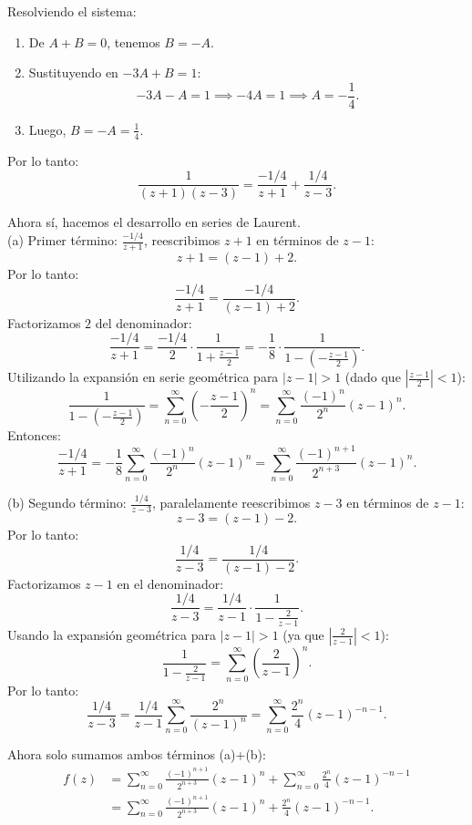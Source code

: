 \documentclass{article}
\begin{document}
\noindent Resolviendo el sistema:
\begin{enumerate}
    
\item  De \( A + B = 0 \), tenemos \( B = -A \).
\item Sustituyendo en \( -3A + B = 1 \):
   \[
   -3A - A = 1 \implies -4A = 1 \implies A = -\frac{1}{4}.
   \]
\item Luego, \( B = -A = \frac{1}{4} \).
\end{enumerate}

Por lo tanto:
\[
\frac{1}{(z+1)(z-3)} = \frac{-1/4}{z+1} + \frac{1/4}{z-3}.
\]

Ahora sí, hacemos el desarrollo en series de Laurent.\\
(a) Primer término: \( \frac{-1/4}{z+1} \), reescribimos \( z+1 \) en términos de \( z-1 \):
\[
z+1 = (z-1) + 2.
\]
Por lo tanto:
\[
\frac{-1/4}{z+1} = \frac{-1/4}{(z-1) + 2}.
\]
Factorizamos \( 2 \) del denominador:
\[
\frac{-1/4}{z+1} = \frac{-1/4}{2} \cdot \frac{1}{1 + \frac{z-1}{2}} = -\frac{1}{8} \cdot \frac{1}{1 - \left(-\frac{z-1}{2}\right)}.
\]
Utilizando la expansión en serie geométrica para \( |z-1| > 1 \) (dado que \( |\frac{z-1}{2}| < 1 \)):
\[
\frac{1}{1 - \left(-\frac{z-1}{2}\right)} = \sum_{n=0}^\infty \left(-\frac{z-1}{2}\right)^n = \sum_{n=0}^\infty \frac{(-1)^n}{2^n} (z-1)^n.
\]
Entonces:
\[
\frac{-1/4}{z+1} = -\frac{1}{8} \sum_{n=0}^\infty \frac{(-1)^n}{2^n} (z-1)^n = \sum_{n=0}^\infty \frac{(-1)^{n+1}}{2^{n+3}} (z-1)^n.
\]

(b) Segundo término: \( \frac{1/4}{z-3} \), paralelamente reescribimos \( z-3 \) en términos de \( z-1 \):
\[
z-3 = (z-1) - 2.
\]
Por lo tanto:
\[
\frac{1/4}{z-3} = \frac{1/4}{(z-1) - 2}.
\]
Factorizamos \( z-1 \) en el denominador:
\[
\frac{1/4}{z-3} = \frac{1/4}{z-1} \cdot \frac{1}{1 - \frac{2}{z-1}}.
\]
Usando la expansión geométrica para \( |z-1| > 1 \) (ya que \( |\frac{2}{z-1}| < 1 \)):
\[
\frac{1}{1 - \frac{2}{z-1}} = \sum_{n=0}^\infty \left(\frac{2}{z-1}\right)^n.
\]
Por lo tanto:
\[
\frac{1/4}{z-3} = \frac{1/4}{z-1} \sum_{n=0}^\infty \frac{2^n}{(z-1)^n} = \sum_{n=0}^\infty \frac{2^n}{4} (z-1)^{-n-1}.
\]

Ahora solo sumamos ambos términos (a)+(b):
\begin{align*}
f(z) &= \sum_{n=0}^\infty \frac{(-1)^{n+1}}{2^{n+3}} (z-1)^n + \sum_{n=0}^\infty \frac{2^n}{4} (z-1)^{-n-1} \\
&= \sum_{n=0}^\infty \frac{(-1)^{n+1}}{2^{n+3}} (z-1)^n +  \frac{2^n}{4} (z-1)^{-n-1}.
\end{align*}
\end{document}
